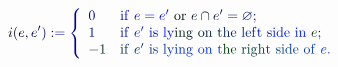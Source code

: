 \documentclass[12pt]{article}
\begin{document}
\makeatletter
\renewcommand*{\@textcolor}[3]{%
  \protect\leavevmode
  \begingroup
    \color#1{#2}#3%
  \endgroup
}
\makeatother
\begin{displaymath}
\mathcolor[RGB]{0,0,15}{i} \mathcolor[RGB]{0,0,30}{(} \mathcolor[RGB]{0,0,45}{e} \mathcolor[RGB]{0,0,60}{,} \mathcolor[RGB]{0,0,75}{e} ^ { \mathcolor[RGB]{0,0,90}{\prime} } \mathcolor[RGB]{0,0,105}{)} \mathcolor[RGB]{0,0,120}{:} \mathcolor[RGB]{0,0,135}{=} \mathcolor[RGB]{0,0,150}{\left\{} \begin{array} {ll} { \mathcolor[RGB]{0,0,165}{0} } & { \mathrm { \mathcolor[RGB]{0,0,180}{i} \mathcolor[RGB]{0,0,195}{f} ~ } \mathcolor[RGB]{0,0,210}{e} \mathcolor[RGB]{0,0,225}{=} \mathcolor[RGB]{0,0,240}{e} ^ { \mathcolor[RGB]{0,0,255}{\prime} } \mathrm { ~ \mathcolor[RGB]{0,15,0}{o} \mathcolor[RGB]{0,15,15}{r} ~ } \mathcolor[RGB]{0,15,30}{e} \mathcolor[RGB]{0,15,45}{\cap} \mathcolor[RGB]{0,15,60}{e} ^ { \mathcolor[RGB]{0,15,75}{\prime} } \mathcolor[RGB]{0,15,90}{=} \mathcolor[RGB]{0,15,105}{\varnothing} \mathcolor[RGB]{0,15,120}{;} } \\ { \mathcolor[RGB]{0,15,135}{1} } & { \mathrm { \mathcolor[RGB]{0,15,150}{i} \mathcolor[RGB]{0,15,165}{f} ~ } \mathcolor[RGB]{0,15,180}{e} ^ { \mathcolor[RGB]{0,15,195}{\prime} } \mathrm { ~ \mathcolor[RGB]{0,15,210}{i} \mathcolor[RGB]{0,15,225}{s} ~ \mathcolor[RGB]{0,15,240}{l} \mathcolor[RGB]{0,15,255}{y} \mathcolor[RGB]{0,30,0}{i} \mathcolor[RGB]{0,30,15}{n} \mathcolor[RGB]{0,30,30}{g} ~ \mathcolor[RGB]{0,30,45}{o} \mathcolor[RGB]{0,30,60}{n} ~ \mathcolor[RGB]{0,30,75}{t} \mathcolor[RGB]{0,30,90}{h} \mathcolor[RGB]{0,30,105}{e} ~ \mathcolor[RGB]{0,30,120}{l} \mathcolor[RGB]{0,30,135}{e} \mathcolor[RGB]{0,30,150}{f} \mathcolor[RGB]{0,30,165}{t} ~ \mathcolor[RGB]{0,30,180}{s} \mathcolor[RGB]{0,30,195}{i} \mathcolor[RGB]{0,30,210}{d} \mathcolor[RGB]{0,30,225}{e} ~ \mathcolor[RGB]{0,30,240}{i} \mathcolor[RGB]{0,30,255}{n} ~ } \mathcolor[RGB]{0,45,0}{e} \mathcolor[RGB]{0,45,15}{;} } \\ { \mathcolor[RGB]{0,45,30}{-} \mathcolor[RGB]{0,45,45}{1} } & { \mathrm { \mathcolor[RGB]{0,45,60}{i} \mathcolor[RGB]{0,45,75}{f} ~ } \mathcolor[RGB]{0,45,90}{e} ^ { \mathcolor[RGB]{0,45,105}{\prime} } \mathrm { ~ \mathcolor[RGB]{0,45,120}{i} \mathcolor[RGB]{0,45,135}{s} ~ \mathcolor[RGB]{0,45,150}{l} \mathcolor[RGB]{0,45,165}{y} \mathcolor[RGB]{0,45,180}{i} \mathcolor[RGB]{0,45,195}{n} \mathcolor[RGB]{0,45,210}{g} ~ \mathcolor[RGB]{0,45,225}{o} \mathcolor[RGB]{0,45,240}{n} ~ \mathcolor[RGB]{0,45,255}{t} \mathcolor[RGB]{0,60,0}{h} \mathcolor[RGB]{0,60,15}{e} ~ \mathcolor[RGB]{0,60,30}{r} \mathcolor[RGB]{0,60,45}{i} \mathcolor[RGB]{0,60,60}{g} \mathcolor[RGB]{0,60,75}{h} \mathcolor[RGB]{0,60,90}{t} ~ \mathcolor[RGB]{0,60,105}{s} \mathcolor[RGB]{0,60,120}{i} \mathcolor[RGB]{0,60,135}{d} \mathcolor[RGB]{0,60,150}{e} ~ \mathcolor[RGB]{0,60,165}{o} \mathcolor[RGB]{0,60,180}{f} ~ } \mathcolor[RGB]{0,60,195}{e} \mathcolor[RGB]{0,60,210}{.} } \end{array} \mathcolor[RGB]{0,60,225}{\right.}
\end{displaymath}
\end{document}
